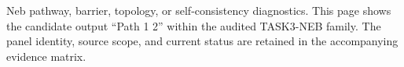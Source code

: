 Neb pathway, barrier, topology, or self-consistency diagnostics. This page shows the candidate output ``Path 1 2'' within the audited TASK3-NEB family. The panel identity, source scope, and current status are retained in the accompanying evidence matrix.
